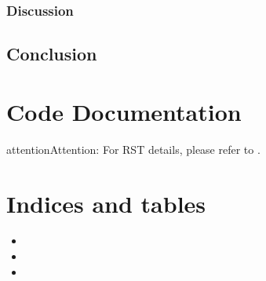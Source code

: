 \documentclass[letterpaper,10pt,english]{sphinxmanual}
\begin{document}
\subsection{Discussion}
\label{\detokenize{docs/BrachaTouegAlg/results:discussion}}
\sphinxstepscope


\section{Conclusion}
\label{\detokenize{docs/BrachaTouegAlg/conclusion:conclusion}}\label{\detokenize{docs/BrachaTouegAlg/conclusion::doc}}
\sphinxstepscope


\chapter{Code Documentation}
\label{\detokenize{docs/BrachaTouegAlg/code:code-documentation}}\label{\detokenize{docs/BrachaTouegAlg/code::doc}}

\begin{savenotes}\sphinxattablestart
\sphinxthistablewithglobalstyle
\sphinxthistablewithnovlinesstyle
\centering
\begin{tabulary}{\linewidth}[t]{}
\sphinxtoprule
\sphinxtableatstartofbodyhook\sphinxbottomrule
\end{tabulary}
\sphinxtableafterendhook\par
\sphinxattableend\end{savenotes}

\begin{sphinxadmonition}{attention}{Attention:}
\sphinxAtStartPar
For RST details, please refer to .
\end{sphinxadmonition}


\chapter{Indices and tables}
\label{\detokenize{index:indices-and-tables}}\begin{itemize}
\item {} 
\sphinxAtStartPar
{}

\item {} 
\sphinxAtStartPar
{}

\item {} 
\sphinxAtStartPar
{}

\end{itemize}
\end{document}
